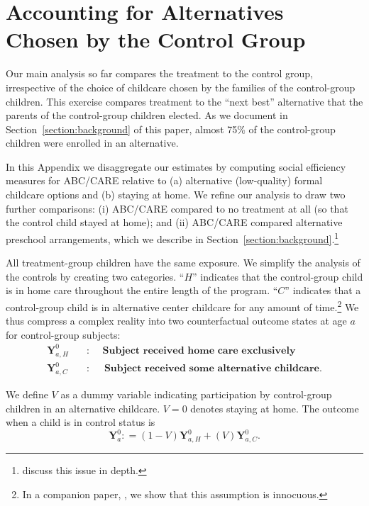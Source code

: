

\section{Accounting for Alternatives Chosen by the Control Group} \label{appendix:cbaresultscont}

\noindent Our main analysis so far compares the treatment to the control group, irrespective of the choice of childcare chosen by the families of the control-group children. This exercise compares treatment to the ``next best'' alternative that the parents of the control-group children elected. As we document in Section~\ref{section:background} of this paper, almost 75\% of the control-group children were enrolled in an alternative.

\noindent In this Appendix we disaggregate our estimates by computing social efficiency measures for ABC/CARE relative to (a) alternative (low-quality) formal childcare options and (b) staying at home. We refine our analysis to draw two further comparisons: (i) ABC/CARE compared to no treatment at all (so that the control child stayed at home); and (ii) ABC/CARE compared alternative preschool arrangements, which we describe in Section~\ref{section:background}.\footnote{\cite{Garcia_Heckman_Ziff_2018_EER} discuss this issue in depth.}

\noindent All treatment-group children have the same exposure. We simplify the analysis of the controls by creating two categories. ``$H$'' indicates that the control-group child is in home care throughout the entire length of the program. ``$C$'' indicates that a control-group child is in alternative center childcare for any amount of time.\footnote{In a companion paper, \cite{Garcia_Heckman_Ziff_2018_EER}, we show that this assumption is innocuous.} We thus compress a complex reality into two counterfactual outcome states at age $a$ for control-group subjects:
\begin{align*}
\bm{Y}_{a,H}^0 \quad &: \quad \textbf{ Subject received home care exclusively} \\
\bm{Y}_{a,C}^0 \quad &: \quad \textbf{ Subject received some alternative childcare}.
\end{align*}

\noindent We define $V$ as a dummy variable indicating participation by control-group children in an alternative childcare. $V=0$ denotes staying at home. The outcome when a child is in control status is
\begin{equation}
\bm{Y}^0_a : = \left( 1 - V \right) \bm{Y}^0_{a,H} + \left( V \right) \bm{Y}^0_{a,C}. \label{eq:meandiff}
\end{equation}

